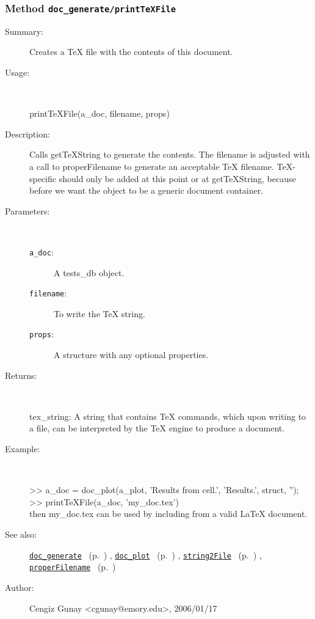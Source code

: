 \subsubsection[Method \texttt{printTeXFile}]{Method \texttt{doc\_generate/printTeXFile}}%
%
\label{ref_doc_generate__printTeXFile}%
\hypertarget{ref_doc_generate__printTeXFile}{}%
\begin{description}
\item[Summary:]Creates a TeX file with the contents of this document.
%
\item[Usage:]~%
\begin{lyxcode}%
printTeXFile(a\_doc, filename, props)
%
\end{lyxcode}%
%
\item[Description:]%
Calls getTeXString to generate the contents. The filename is adjusted with 
 a call to properFilename to generate an acceptable TeX filename. TeX-specific
 should only be added at this point or at getTeXString, because before we want
 the object to be a generic document container.
\item[Parameters:]~
\begin{description}%
\item[\texttt{a\_doc}:]
 A tests\_db object.
\item[\texttt{filename}:]
 To write the TeX string.
\item[\texttt{props}:]
 A structure with any optional properties.
\end{description}%
%
\item[Returns:]~

	tex\_string: A string that contains TeX commands, which upon writing to a file,
	  can be interpreted by the TeX engine to produce a document.
%
\item[Example:]~
\begin{lyxcode}        >> a\_doc = doc\_plot(a\_plot, 'Results from cell.', 'Results.', struct, ''); \\%
        >> printTeXFile(a\_doc, 'my\_doc.tex')\\%
        then my\_doc.tex can be used by including from a valid LaTeX document.\\%
\end{lyxcode}
%
\item[See also:]%
\hyperlink{ref_doc_generate}{\texttt{doc\_generate}}%
\ (p.~\pageref{ref_doc_generate})%
%
, \hyperlink{ref_doc_plot}{\texttt{doc\_plot}}%
\ (p.~\pageref{ref_doc_plot})%
%
, \hyperlink{ref_string2File}{\texttt{string2File}}%
\ (p.~\pageref{ref_string2File})%
%
, \hyperlink{ref_properFilename}{\texttt{properFilename}}%
\ (p.~\pageref{ref_properFilename})%
%
%
\item[Author:]%
Cengiz Gunay <cgunay@emory.edu>, 2006/01/17%
\end{description}
\methodline%

